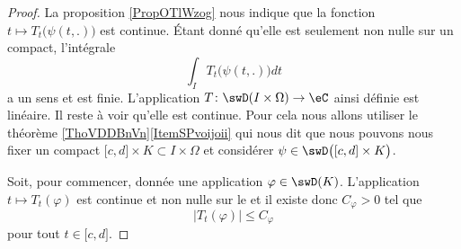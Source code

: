 \begin{proof}
    La proposition \ref{PropOTlWzog} nous indique que la fonction \( t\mapsto T_t\big( \psi(t,.) \big)\) est continue. Étant donné qu'elle est seulement non nulle sur un compact, l'intégrale
    \begin{equation}
        \int_IT_t\big( \psi(t,.) \big)dt
    \end{equation}
    a un sens et est finie. L'application \( T\colon \swD(I\times \Omega)\to \eC\) ainsi définie est linéaire. Il reste à voir qu'elle est continue. Pour cela nous allons utiliser le théorème \ref{ThoVDDBnVn}\ref{ItemSPvoijoii} qui nous dit que nous pouvons nous fixer un compact \( \mathopen[ c , d \mathclose]\times K\subset I\times\Omega\) et considérer \( \psi\in \swD\big( \mathopen[ c , d \mathclose]\times K \big)\).
    
    Soit, pour commencer, donnée une application \( \varphi\in\swD(K)\). L'application \( t\mapsto T_t(\varphi)\) est continue et non nulle sur le  et il existe donc \( C_{\varphi}>0\) tel que
    \begin{equation}
        | T_t(\varphi) |\leq C_{\varphi}
    \end{equation}
    pour tout \( t\in\mathopen[ c , d \mathclose]\). 
    

\end{proof}
